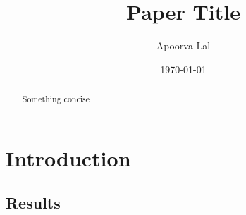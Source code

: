 \documentclass[12pt,reqno]{amsart} %
\title{Paper Title}
\author{Apoorva Lal}
\date{\today}
\begin{document}
\begin{abstract} Something concise
\end{abstract}

\maketitle



\section{Introduction} \label{intro}

\parencite{cardMinimumWagesEmployment1994}

\subsection{Results}

\lipsum[5]


\renewcommand{\mkbibnamefamily}[1]{\textsc{#1}}
\printbibliography

\appendix


\medskip
\end{document}
